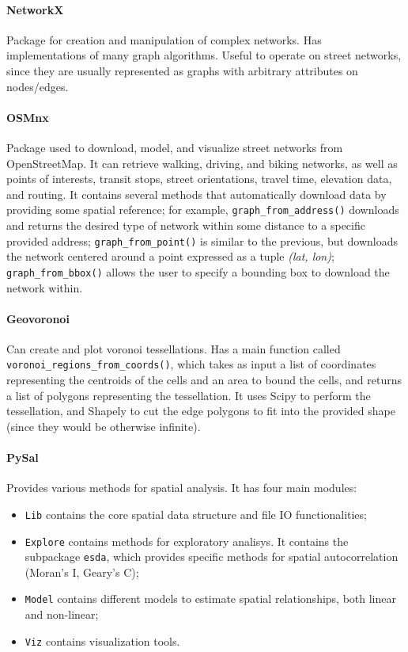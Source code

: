 \paragraph{NetworkX}
Package for creation and manipulation of complex networks. Has implementations of many graph algorithms. Useful to operate on street networks, since they are usually represented as graphs with arbitrary attributes on nodes/edges.

\paragraph{OSMnx}
Package used to download, model, and visualize street networks from OpenStreetMap. It can retrieve walking, driving, and biking networks, as well as points of interests, transit stops, street orientations, travel time, elevation data, and routing. It contains several methods that automatically download data by providing some spatial reference; for example, \texttt{graph\_from\_address()} downloads and returns the desired type of network within some distance to a specific provided address; \texttt{graph\_from\_point()} is similar to the previous, but downloads the network centered around a point expressed as a tuple \textit{(lat, lon)}; \texttt{graph\_from\_bbox()} allows the user to specify a bounding box to download the network within.

\paragraph{Geovoronoi}
Can create and plot voronoi tessellations. Has a main function called \texttt{voronoi\_regions\_from\_coords()}, which takes as input a list of coordinates representing the centroids of the cells and an area to bound the cells, and returns a list of polygons representing the tessellation. It uses Scipy to perform the tessellation, and Shapely to cut the edge polygons to fit into the provided shape (since they would be otherwise infinite).

\paragraph{PySal}
Provides various methods for spatial analysis. It has four main modules:
\begin{itemize}[itemsep=-5pt, label=-]
    \item \texttt{Lib} contains the core spatial data structure and file IO functionalities;
    \item \texttt{Explore} contains methods for exploratory analisys. It contains the subpackage \texttt{esda}, which provides specific methods for spatial autocorrelation (Moran's I, Geary's C);
    \item \texttt{Model} contains different models to estimate spatial relationships, both linear and non-linear;
    \item \texttt{Viz} contains visualization tools.
\end{itemize}

